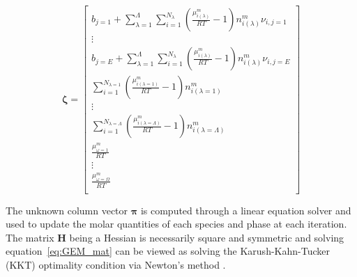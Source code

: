      \begin{equation}\label{eq:Constraint_mat}
        \boldsymbol{\zeta} =
        \begin{bmatrix}
            b_{j=1} +  \sum_{\lambda=1}^{\Lambda} \sum_{i=1}^{N_\lambda} \left( \frac{\mu_{i(\lambda)}^{m}}{RT} -1 \right)n_{i(\lambda)}^{m} \nu_{i,j=1}\\
            \vdots \\
            b_{j=E} +  \sum_{\lambda=1}^{\Lambda} \sum_{i=1}^{N_\lambda} \left( \frac{\mu_{i(\lambda)}^{m}}{RT} -1 \right)n_{i(\lambda)}^{m} \nu_{i,j=E}\\
            \sum_{i=1}^{N_{\lambda=1}} \left( \frac{\mu_{i(\lambda=1)}^{m}}{RT} -1 \right)n_{i(\lambda=1)}^{m} \\
            \vdots \\
            \sum_{i=1}^{N_{\lambda=\Lambda}} \left( \frac{\mu_{i(\lambda=\Lambda)}^{m}}{RT} -1 \right)n_{i(\lambda=\Lambda)}^{m} \\
            \frac{\mu_{\omega=1}^{m}}{RT} \\
            \vdots\\
            \frac{\mu_{\omega=\Omega}^{m}}{RT} \\
        \end{bmatrix}
    \end{equation}

The unknown column vector $\boldsymbol{\pi}$ is computed through a linear equation solver and used to update the molar quantities of each species and phase at each  iteration. The matrix $\mathbf{H}$ being a Hessian is necessarily square and symmetric and solving equation~\eqref{eq:GEM_mat} can be viewed as solving the Karush-Kahn-Tucker (KKT) optimality condition via Newton's method \cite{Nocedal06}.
